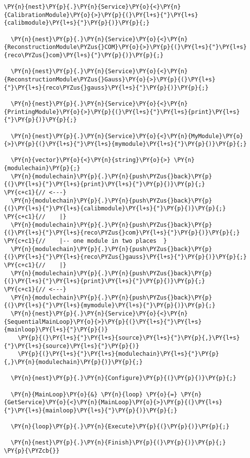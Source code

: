 \begin{Verbatim}[commandchars=\\\{\}]
  \PY{n}{nest}\PY{p}{.}\PY{n}{Service}\PY{o}{<}\PY{n}{CalibrationModule}\PY{o}{>}\PY{p}{(}\PY{l+s}{"}\PY{l+s}{calibmodule}\PY{l+s}{"}\PY{p}{)}\PY{p}{;}

  \PY{n}{nest}\PY{p}{.}\PY{n}{Service}\PY{o}{<}\PY{n}{ReconstructionModule\PYZus{}COM}\PY{o}{>}\PY{p}{(}\PY{l+s}{"}\PY{l+s}{reco\PYZus{}com}\PY{l+s}{"}\PY{p}{)}\PY{p}{;}

  \PY{n}{nest}\PY{p}{.}\PY{n}{Service}\PY{o}{<}\PY{n}{ReconstructionModule\PYZus{}Gauss}\PY{o}{>}\PY{p}{(}\PY{l+s}{"}\PY{l+s}{reco\PYZus{}gauss}\PY{l+s}{"}\PY{p}{)}\PY{p}{;}

  \PY{n}{nest}\PY{p}{.}\PY{n}{Service}\PY{o}{<}\PY{n}{PrintingModule}\PY{o}{>}\PY{p}{(}\PY{l+s}{"}\PY{l+s}{print}\PY{l+s}{"}\PY{p}{)}\PY{p}{;}

  \PY{n}{nest}\PY{p}{.}\PY{n}{Service}\PY{o}{<}\PY{n}{MyModule}\PY{o}{>}\PY{p}{(}\PY{l+s}{"}\PY{l+s}{mymodule}\PY{l+s}{"}\PY{p}{)}\PY{p}{;}

  \PY{n}{vector}\PY{o}{<}\PY{n}{string}\PY{o}{>} \PY{n}{modulechain}\PY{p}{;}
  \PY{n}{modulechain}\PY{p}{.}\PY{n}{push\PYZus{}back}\PY{p}{(}\PY{l+s}{"}\PY{l+s}{print}\PY{l+s}{"}\PY{p}{)}\PY{p}{;}       \PY{c+c1}{// <---}
  \PY{n}{modulechain}\PY{p}{.}\PY{n}{push\PYZus{}back}\PY{p}{(}\PY{l+s}{"}\PY{l+s}{calibmodule}\PY{l+s}{"}\PY{p}{)}\PY{p}{;} \PY{c+c1}{//    |}
  \PY{n}{modulechain}\PY{p}{.}\PY{n}{push\PYZus{}back}\PY{p}{(}\PY{l+s}{"}\PY{l+s}{reco\PYZus{}com}\PY{l+s}{"}\PY{p}{)}\PY{p}{;}    \PY{c+c1}{//    |-- one module in two places  }
  \PY{n}{modulechain}\PY{p}{.}\PY{n}{push\PYZus{}back}\PY{p}{(}\PY{l+s}{"}\PY{l+s}{reco\PYZus{}gauss}\PY{l+s}{"}\PY{p}{)}\PY{p}{;}  \PY{c+c1}{//    |}
  \PY{n}{modulechain}\PY{p}{.}\PY{n}{push\PYZus{}back}\PY{p}{(}\PY{l+s}{"}\PY{l+s}{print}\PY{l+s}{"}\PY{p}{)}\PY{p}{;}       \PY{c+c1}{// <---}
  \PY{n}{modulechain}\PY{p}{.}\PY{n}{push\PYZus{}back}\PY{p}{(}\PY{l+s}{"}\PY{l+s}{mymodule}\PY{l+s}{"}\PY{p}{)}\PY{p}{;}
  \PY{n}{nest}\PY{p}{.}\PY{n}{Service}\PY{o}{<}\PY{n}{SequentialMainLoop}\PY{o}{>}\PY{p}{(}\PY{l+s}{"}\PY{l+s}{mainloop}\PY{l+s}{"}\PY{p}{)}
    \PY{p}{(}\PY{l+s}{"}\PY{l+s}{source}\PY{l+s}{"}\PY{p}{,}\PY{l+s}{"}\PY{l+s}{source}\PY{l+s}{"}\PY{p}{)}
    \PY{p}{(}\PY{l+s}{"}\PY{l+s}{modulechain}\PY{l+s}{"}\PY{p}{,}\PY{n}{modulechain}\PY{p}{)}\PY{p}{;}

  \PY{n}{nest}\PY{p}{.}\PY{n}{Configure}\PY{p}{(}\PY{p}{)}\PY{p}{;}

  \PY{n}{MainLoop}\PY{o}{&} \PY{n}{loop} \PY{o}{=} \PY{n}{GetService}\PY{o}{<}\PY{n}{MainLoop}\PY{o}{>}\PY{p}{(}\PY{l+s}{"}\PY{l+s}{mainloop}\PY{l+s}{"}\PY{p}{)}\PY{p}{;}

  \PY{n}{loop}\PY{p}{.}\PY{n}{Execute}\PY{p}{(}\PY{p}{)}\PY{p}{;}
  
  \PY{n}{nest}\PY{p}{.}\PY{n}{Finish}\PY{p}{(}\PY{p}{)}\PY{p}{;}
\PY{p}{\PYZcb{}}
\end{Verbatim}
